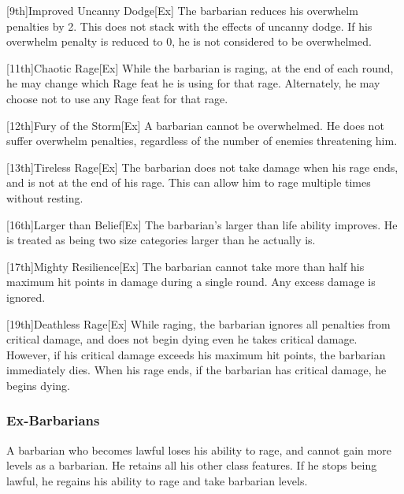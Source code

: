 [9th]{Improved Uncanny Dodge}[Ex]
The barbarian reduces his overwhelm penalties by 2.
This does not stack with the effects of uncanny dodge.
If his overwhelm penalty is reduced to 0, he is not considered to be overwhelmed.

[11th]{Chaotic Rage}[Ex]
While the barbarian is raging, at the end of each round, he may change which Rage feat he is using for that rage.
Alternately, he may choose not to use any Rage feat for that rage.

[12th]{Fury of the Storm}[Ex]
A barbarian cannot be overwhelmed.
He does not suffer overwhelm penalties, regardless of the number of enemies threatening him.

[13th]{Tireless Rage}[Ex]
The barbarian does not take damage when his rage ends, and is not \fatigued at the end of his rage.
This can allow him to rage multiple times without resting.

[16th]{Larger than Belief}[Ex]
The barbarian's larger than life ability improves.
He is treated as being two size categories larger than he actually is.

[17th]{Mighty Resilience}[Ex]
The barbarian cannot take more than half his maximum hit points in damage during a single round.
Any excess damage is ignored.

[19th]{Deathless Rage}[Ex]
While raging, the barbarian ignores all penalties from critical damage, and does not begin dying even he takes critical damage.
However, if his critical damage exceeds his maximum hit points, the barbarian immediately dies.
When his rage ends, if the barbarian has critical damage, he begins dying.

\subsubsection{Ex-Barbarians}
A barbarian who becomes lawful loses his ability to rage, and cannot gain more levels as a barbarian.
He retains all his other class features.
If he stops being lawful, he regains his ability to rage and take barbarian levels.

